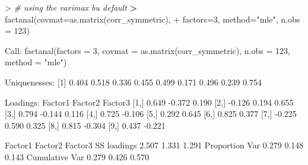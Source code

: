 \documentclass[
]{article}
\newenvironment{Shaded}{\begin{snugshade}}{\end{snugshade}}
\newcommand{\AttributeTok}[1]{\textcolor[rgb]{0.77,0.63,0.00}{#1}}
\newcommand{\CommentTok}[1]{\textcolor[rgb]{0.56,0.35,0.01}{\textit{#1}}}
\newcommand{\DecValTok}[1]{\textcolor[rgb]{0.00,0.00,0.81}{#1}}
\newcommand{\ErrorTok}[1]{\textcolor[rgb]{0.64,0.00,0.00}{\textbf{#1}}}
\newcommand{\FloatTok}[1]{\textcolor[rgb]{0.00,0.00,0.81}{#1}}
\newcommand{\FunctionTok}[1]{\textcolor[rgb]{0.00,0.00,0.00}{#1}}
\newcommand{\NormalTok}[1]{#1}
\newcommand{\SpecialCharTok}[1]{\textcolor[rgb]{0.00,0.00,0.00}{#1}}
\newcommand{\StringTok}[1]{\textcolor[rgb]{0.31,0.60,0.02}{#1}}
\begin{document}
\begin{Shaded}
\begin{Highlighting}[]
\SpecialCharTok{\textgreater{}} \CommentTok{\# using the varimax bu default}
\ErrorTok{\textgreater{}} \FunctionTok{factanal}\NormalTok{(}\AttributeTok{covmat=}\FunctionTok{as.matrix}\NormalTok{(corr\_symmetric), }
\SpecialCharTok{+}            \AttributeTok{factors=}\DecValTok{3}\NormalTok{, }\AttributeTok{method=}\StringTok{"mle"}\NormalTok{, }\AttributeTok{n.obs =} \DecValTok{123}\NormalTok{)}

\NormalTok{Call}\SpecialCharTok{:}
\FunctionTok{factanal}\NormalTok{(}\AttributeTok{factors =} \DecValTok{3}\NormalTok{, }\AttributeTok{covmat =} \FunctionTok{as.matrix}\NormalTok{(corr\_symmetric), }\AttributeTok{n.obs =} \DecValTok{123}\NormalTok{,     }\AttributeTok{method =} \StringTok{"mle"}\NormalTok{)}

\NormalTok{Uniquenesses}\SpecialCharTok{:}
\NormalTok{[}\DecValTok{1}\NormalTok{] }\FloatTok{0.404} \FloatTok{0.518} \FloatTok{0.336} \FloatTok{0.455} \FloatTok{0.499} \FloatTok{0.171} \FloatTok{0.496} \FloatTok{0.239} \FloatTok{0.754}

\NormalTok{Loadings}\SpecialCharTok{:}
\NormalTok{      Factor1 Factor2 Factor3}
\NormalTok{ [}\DecValTok{1}\NormalTok{,]  }\FloatTok{0.649}  \SpecialCharTok{{-}}\FloatTok{0.372}   \FloatTok{0.190} 
\NormalTok{ [}\DecValTok{2}\NormalTok{,] }\SpecialCharTok{{-}}\FloatTok{0.126}   \FloatTok{0.194}   \FloatTok{0.655} 
\NormalTok{ [}\DecValTok{3}\NormalTok{,]  }\FloatTok{0.794}  \SpecialCharTok{{-}}\FloatTok{0.144}   \FloatTok{0.116} 
\NormalTok{ [}\DecValTok{4}\NormalTok{,]  }\FloatTok{0.725}  \SpecialCharTok{{-}}\FloatTok{0.106}         
\NormalTok{ [}\DecValTok{5}\NormalTok{,]          }\FloatTok{0.292}   \FloatTok{0.645} 
\NormalTok{ [}\DecValTok{6}\NormalTok{,]          }\FloatTok{0.825}   \FloatTok{0.377} 
\NormalTok{ [}\DecValTok{7}\NormalTok{,] }\SpecialCharTok{{-}}\FloatTok{0.225}   \FloatTok{0.590}   \FloatTok{0.325} 
\NormalTok{ [}\DecValTok{8}\NormalTok{,]  }\FloatTok{0.815}          \SpecialCharTok{{-}}\FloatTok{0.304} 
\NormalTok{ [}\DecValTok{9}\NormalTok{,]  }\FloatTok{0.437}          \SpecialCharTok{{-}}\FloatTok{0.221} 

\NormalTok{               Factor1 Factor2 Factor3}
\NormalTok{SS loadings      }\FloatTok{2.507}   \FloatTok{1.331}   \FloatTok{1.291}
\NormalTok{Proportion Var   }\FloatTok{0.279}   \FloatTok{0.148}   \FloatTok{0.143}
\NormalTok{Cumulative Var   }\FloatTok{0.279}   \FloatTok{0.426}   \FloatTok{0.570}


\end{Highlighting}
\end{Shaded}
\end{document}
